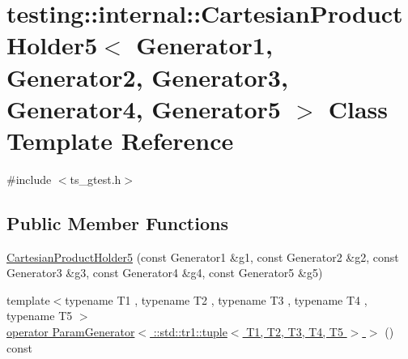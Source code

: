 \hypertarget{classtesting_1_1internal_1_1CartesianProductHolder5}{\section{testing\-:\-:internal\-:\-:Cartesian\-Product\-Holder5$<$ Generator1, Generator2, Generator3, Generator4, Generator5 $>$ Class Template Reference}
\label{classtesting_1_1internal_1_1CartesianProductHolder5}
}


{\ttfamily \#include $<$ts\-\_\-gtest.\-h$>$}

\subsection*{Public Member Functions}
\begin{DoxyCompactItemize}
\item 
\hyperlink{classtesting_1_1internal_1_1CartesianProductHolder5_afb3a413ff0e59f31e621937f968d0923}{Cartesian\-Product\-Holder5} (const Generator1 \&g1, const Generator2 \&g2, const Generator3 \&g3, const Generator4 \&g4, const Generator5 \&g5)
\item 
{\footnotesize template$<$typename T1 , typename T2 , typename T3 , typename T4 , typename T5 $>$ }\\\hyperlink{classtesting_1_1internal_1_1CartesianProductHolder5_a4222dcf18066166933092692bb6925b1}{operator Param\-Generator$<$ \-::std\-::tr1\-::tuple$<$ T1, T2, T3, T4, T5 $>$ $>$} () const 
\end{DoxyCompactItemize}



